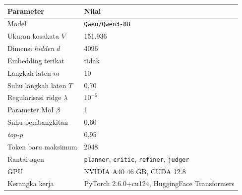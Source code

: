 \begin{longtable}{ll}
\hline
Parameter & Nilai \\
\hline\endhead
Model & \texttt{Qwen/Qwen3-8B} \\
Ukuran kosakata $V$ & 151.936 \\
Dimensi \textit{hidden} $d$ & 4096 \\
Embedding terikat & tidak \\
Langkah laten $m$ & 10 \\
Suhu langkah laten $T$ & 0,70 \\
Regularisasi ridge $\lambda$ & $10^{-5}$ \\
Parameter MoI $\beta$ & 1 \\
Suhu pembangkitan & 0,60 \\
\textit{top-p} & 0,95 \\
Token baru maksimum & 2048 \\
Rantai agen & \texttt{planner}, \texttt{critic}, \texttt{refiner}, \texttt{judger} \\

GPU & NVIDIA A40 46 GB, CUDA 12.8 \\
Kerangka kerja & PyTorch 2.6.0+cu124, HuggingFace Transformers \\
\hline
\end{longtable}

